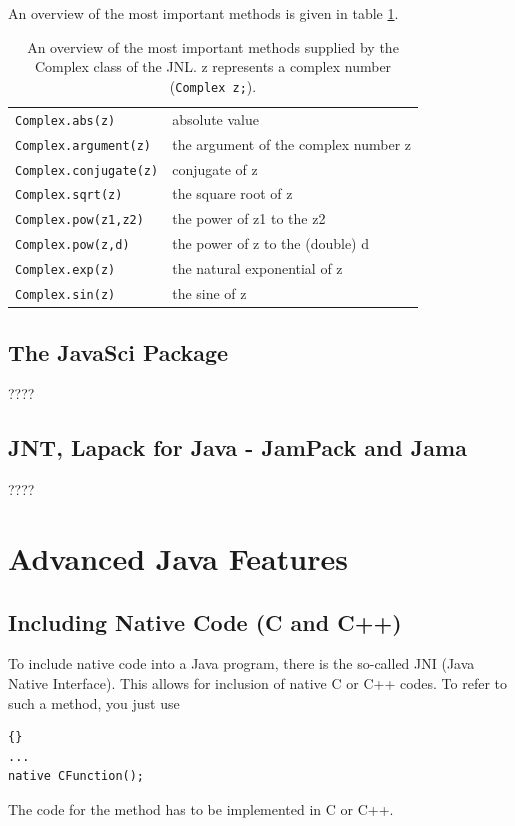 An overview of the most important methods is given in table 
\ref{tab:JNLComplex}.
\begin{table}[htbp]
  \begin{center}
    \begin{tabular}{l|l}
      \verb|Complex.abs(z)| & absolute value \\
      \verb|Complex.argument(z)| & the argument of the complex number z \\
      \verb|Complex.conjugate(z)| & conjugate of z  \\
      \verb|Complex.sqrt(z)| & the square root of z \\
      \verb|Complex.pow(z1,z2)| & the power of z1 to the z2\\
      \verb|Complex.pow(z,d)| & the power of z to the (double) d\\
      \verb|Complex.exp(z)| & the natural exponential of z \\
      \verb|Complex.sin(z)| & the sine of z \\
    \end{tabular}
    \caption{An overview of the most important methods supplied by the 
      Complex class of the JNL. z represents a complex number 
      (\texttt{Complex z;}).}
    \label{tab:JNLComplex}
  \end{center}
\end{table}


\subsection{The JavaSci Package}
????

\subsection{JNT, Lapack for Java - JamPack and Jama}
????




\section{Advanced Java Features}

\subsection{Including Native Code (C and C++)}
To include native code into a Java program, there is the so-called
JNI (Java Native Interface). This allows for inclusion of native
C or C++ codes. To refer to such a method, you just use
\begin{lstlisting}{}
...
native CFunction();
\end{lstlisting}
The code for the method has to be implemented in C or C++.

